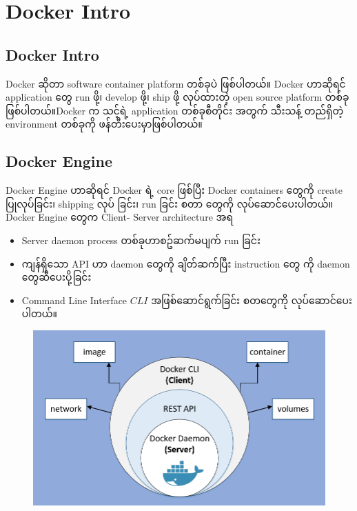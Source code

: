\section{Docker Intro}\label{docker-intro}

\subsection{Docker Intro}\label{docker-intro-1}

Docker ဆိုတာ software container platform တစ်ခုပဲ ဖြစ်ပါတယ်။ Docker
ဟာဆိုရင် application ​တွေ run ဖို့၊ develop ဖို့၊ ship ဖို့ လုပ်ထားတဲ့
open source platform တစ်ခုဖြစ်ပါတယ်။Docker က သင့်ရဲ့ application
တစ်ခုစီတိုင်း အတွက် သီးသန့် တည်ရှိတဲ့ environment တစ်ခုကို
ဖန်တီး​ပေးမှာဖြစ်ပါတယ်။

\subsection{Docker Engine}\label{docker-engine}

Docker Engine ဟာဆိုရင် Docker ရဲ့ core ဖြစ်ပြီး Docker containers
​တွေကို create ပြုလုပ်​ခြင်း၊ shipping လုပ် ခြင်း၊ run ခြင်း စတာ ​တွေကို
လုပ်​ဆောင်​ပေးပါတယ်။ Docker Engine ​တွေက Client- Server architecture အရ

\begin{itemize}
\itemsep1pt\parskip0pt
\item
  Server daemon process တစ်ခုဟာစဥ်ဆက်မပျက် run ခြင်း\\
\item
  ကျန်ရှိ​သော API ဟာ daemon ​တွေကို ချိတ်ဆက်ပြီး instruction ​တွေ ကို
  daemon ​တွေဆီ ​ပေးပို့ခြင်း\\
\item
  Command Line Interface $CLI$ အဖြစ်​ဆောင်ရွက်ခြင်း စတ​တွေကို
  လုပ်​ဆောင်​ပေးပါတယ်။
\end{itemize}

\begin{figure}[htbp]
\centering
\includegraphics{.gitbook/assets/screenshot-129.png}
\end{figure}

